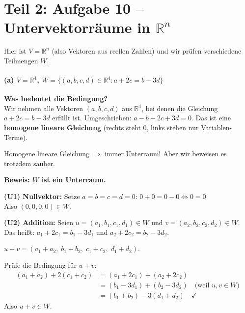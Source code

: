\documentclass[a4paper,12pt]{article}
\begin{document}
\newpage

\part*{Teil 2: Aufgabe 10 -- Untervektorr\"aume in $\mathbb{R}^n$}

Hier ist $V = \mathbb{R}^n$ (also Vektoren aus reellen Zahlen) und wir pr\"ufen verschiedene Teilmengen $W$.

\subsection*{(a) \quad $V = \mathbb{R}^4$, \quad $W = \{(a,b,c,d) \in \mathbb{R}^4 : a + 2c = b - 3d\}$}

\textbf{Was bedeutet die Bedingung?}\\
Wir nehmen alle Vektoren $(a,b,c,d)$ aus $\mathbb{R}^4$, bei denen die Gleichung $a + 2c = b - 3d$ erf\"ullt ist. Umgeschrieben: $a - b + 2c + 3d = 0$. Das ist eine \textbf{homogene lineare Gleichung} (rechts steht $0$, links stehen nur Variablen-Terme).

\begin{merkbox}
Homogene lineare Gleichung $\Rightarrow$ immer Unterraum! Aber wir beweisen es trotzdem sauber.
\end{merkbox}

\textbf{Beweis: $W$ ist ein Unterraum.}

\textbf{(U1) Nullvektor:} Setze $a = b = c = d = 0$: $0 + 0 = 0 - 0 \Leftrightarrow 0 = 0$ \checkmark\\
Also $(0,0,0,0) \in W$.

\textbf{(U2) Addition:} Seien $u = (a_1, b_1, c_1, d_1) \in W$ und $v = (a_2, b_2, c_2, d_2) \in W$.\\
Das hei\ss t: $a_1 + 2c_1 = b_1 - 3d_1$ und $a_2 + 2c_2 = b_2 - 3d_2$.

$u + v = (a_1 + a_2,\; b_1 + b_2,\; c_1 + c_2,\; d_1 + d_2)$.

Pr\"ufe die Bedingung f\"ur $u + v$:
\begin{align*}
(a_1 + a_2) + 2(c_1 + c_2) &= (a_1 + 2c_1) + (a_2 + 2c_2) \\
&= (b_1 - 3d_1) + (b_2 - 3d_2) \quad \text{(weil $u, v \in W$)} \\
&= (b_1 + b_2) - 3(d_1 + d_2) \quad \checkmark
\end{align*}
Also $u + v \in W$.
\end{document}
